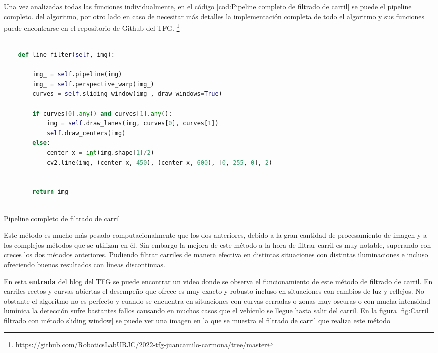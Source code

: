 \bigskip

Una vez analizadas todas las funciones individualmente, en el código \ref{cod:Pipeline completo de filtrado de carril} se puede el pipeline completo. del algoritmo, por otro lado en caso de necesitar más detalles la implementación completa de todo el algoritmo y sus funciones puede encontrarse en el repositorio de Github del \ac{TFG}. \footnote{\url{https://github.com/RoboticsLabURJC/2022-tfg-juancamilo-carmona/tree/master}}

\begin{code}[H]
	\begin{lstlisting}[language=Python]
	
    def line_filter(self, img):

        img_ = self.pipeline(img)
        img_ = self.perspective_warp(img_)
        curves = self.sliding_window(img_, draw_windows=True)
        
        if curves[0].any() and curves[1].any():
            img = self.draw_lanes(img, curves[0], curves[1])
            self.draw_centers(img)
        else:
            center_x = int(img.shape[1]/2)        
            cv2.line(img, (center_x, 450), (center_x, 600), [0, 255, 0], 2)    


        return img
        
	\end{lstlisting}
\caption[Pipeline completo de filtrado de carril]{Pipeline completo de filtrado de carril}
\label{cod:Pipeline completo de filtrado de carril}
\end{code}

\bigskip

Este método es mucho más pesado computacionalmente que los dos anteriores, debido a la gran cantidad de procesamiento de imagen y a los complejos métodos que se utilizan en él. Sin embargo la mejora de este método a la hora de filtrar carril es muy notable, superando con creces los dos métodos anteriores. Pudiendo filtrar carriles de manera efectiva en distintas situaciones con distintas iluminaciones e incluso ofreciendo buenos resultados con líneas discontinuas.
 
\bigskip
En esta \href{https://roboticslaburjc.github.io/2022-tfg-juancamilo-carmona/DEMOS/}{\textbf{entrada}} del blog del \ac{TFG} se puede encontrar un video donde se observa el funcionamiento de este método de filtrado de carril. En carriles rectos y curvas abiertas el desempeño que ofrece es muy exacto y robusto incluso en situaciones con cambios de luz y reflejos. No obstante el algoritmo no es perfecto y cuando se encuentra en situaciones con curvas cerradas  o zonas muy oscuras  o con mucha intensidad lumínica la detección sufre bastantes fallos causando en muchos casos que el vehículo se llegue hasta salir del carril. En la figura \ref{fig:Carril filtrado con método sliding window} se puede ver una imagen en la que se muestra el filtrado de carril que realiza este método

